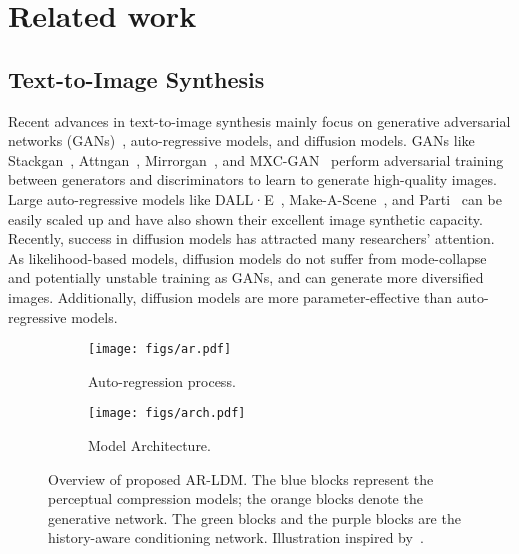 \documentclass[10pt,twocolumn,letterpaper]{article}
\begin{document}
\section{Related work}
\subsection{Text-to-Image Synthesis}
Recent advances in text-to-image synthesis mainly focus on generative adversarial networks (GANs)~\cite{gan}, auto-regressive models, and diffusion models. GANs like Stackgan~\cite{stackgan}, Attngan~\cite{attngan}, Mirrorgan~\cite{mirrorgan}, and MXC-GAN~\cite{mxcgan} perform adversarial training between generators and discriminators to learn to generate high-quality images. Large auto-regressive models like DALL·E~\cite{dalle}, Make-A-Scene~\cite{makeascene}, and Parti~\cite{parti} can be easily scaled up and have also shown their excellent image synthetic capacity. Recently, success in diffusion models has attracted many researchers' attention. As likelihood-based models, diffusion models do not suffer from mode-collapse and potentially unstable training as GANs, and can generate more diversified images. Additionally, diffusion models are more parameter-effective than auto-regressive models.

\begin{figure*}[!th]
\begin{subfigure}{0.28\linewidth}
\centering
\texttt{[image: figs/ar.pdf]}
\caption{Auto-regression process.}
\label{fig:ar}
\end{subfigure}
\hfill
\vline
\hfill
\begin{subfigure}{0.71\linewidth}
\centering
\texttt{[image: figs/arch.pdf]}
\caption{Model Architecture.}
\label{fig:arch}
\end{subfigure}
\caption{Overview of proposed AR-LDM. The blue blocks represent the perceptual compression models; the orange blocks denote the generative network. The green blocks and the purple blocks are the history-aware conditioning network. Illustration inspired by~\cite{vilt}.}
\label{fig:modeloverview}
\end{figure*}
\end{document}
